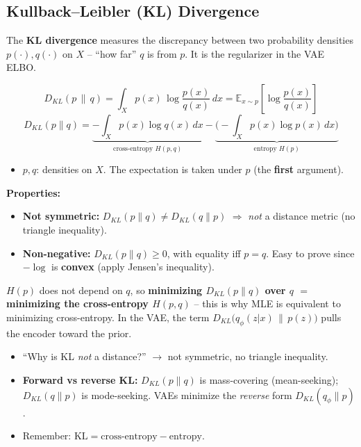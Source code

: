 \documentclass[10pt,a4paper]{article}
\begin{document}
	\subsection{Kullback--Leibler (KL) Divergence}

	\begin{definitionbox}
		The \textbf{KL divergence} measures the discrepancy between two probability densities $p(\cdot),q(\cdot)$ on $X$ -- ``how far'' $q$ is from $p$. It is the regularizer in the VAE ELBO.
	\end{definitionbox}

	\begin{formulabox}
		\[
		D_{KL}(p\,\|\,q) = \int_X p(x)\,\log\frac{p(x)}{q(x)}\,dx
		= \mathbb{E}_{x\sim p}\!\left[\log\frac{p(x)}{q(x)}\right]
		\]
		\[
		D_{KL}(p\|q) =
		\underbrace{-\!\int_X p(x)\log q(x)\,dx}_{\text{cross-entropy } H(p,q)}
		-\underbrace{\Big(\!-\!\int_X p(x)\log p(x)\,dx\Big)}_{\text{entropy } H(p)}
		\]
	\end{formulabox}
	\begin{itemize}[leftmargin=*]
		\item $p,q$: densities on $X$. \quad The expectation is taken under $p$ (the \textbf{first} argument).
	\end{itemize}

	\textbf{Properties:}
	\begin{itemize}[leftmargin=*]
		\item \textbf{Not symmetric:} $D_{KL}(p\|q)\neq D_{KL}(q\|p)$ $\Rightarrow$ \emph{not} a distance metric (no triangle inequality).
		\item \textbf{Non-negative:} $D_{KL}(p\|q)\ge 0$, with equality iff $p=q$. Easy to prove since $-\log$ is \textbf{convex} (apply Jensen's inequality).
	\end{itemize}
	
	\begin{importantbox}
		$H(p)$ does not depend on $q$, so \textbf{minimizing $D_{KL}(p\|q)$ over $q$ $=$ minimizing the cross-entropy $H(p,q)$} -- this is why MLE is equivalent to minimizing cross-entropy. In the VAE, the term $D_{KL}\big(q_\phi(z|x)\,\|\,p(z)\big)$ pulls the encoder toward the prior.
	\end{importantbox}

	\begin{examtipbox}
		\begin{itemize}[leftmargin=*]
			\item ``Why is KL \emph{not} a distance?'' $\to$ not symmetric, no triangle inequality.
			\item \textbf{Forward vs reverse KL:} $D_{KL}(p\|q)$ is mass-covering (mean-seeking); $D_{KL}(q\|p)$ is mode-seeking. VAEs minimize the \emph{reverse} form $D_{KL}(q_\phi\|p)$.
			\item Remember: $\text{KL} = \text{cross-entropy} - \text{entropy}$.
		\end{itemize}
	\end{examtipbox}
\end{document}
